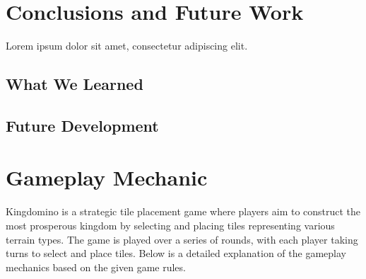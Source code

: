 \documentclass[conference]{IEEEtran}
\begin{document}

\section{Conclusions and Future Work}
\label{sec:conclusions}

Lorem ipsum dolor sit amet, consectetur adipiscing elit.

\subsection{What We Learned}

\subsection{Future Development}

\appendices%
\section{Gameplay Mechanic}\label{app:gameplay}

Kingdomino is a strategic tile placement game where players aim to construct the most prosperous kingdom by selecting and placing tiles representing various terrain types. The game is played over a series of rounds, with each player taking turns to select and place tiles. Below is a detailed explanation of the gameplay mechanics based on the given game rules.
\end{document}
